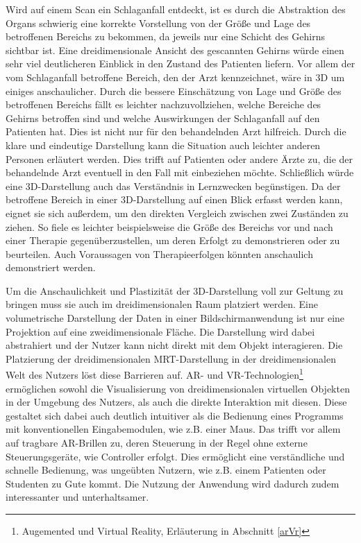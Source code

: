 Wird auf einem Scan ein Schlaganfall entdeckt, ist es durch die Abstraktion des Organs schwierig eine korrekte Vorstellung von der Größe und Lage des betroffenen Bereichs zu bekommen, da jeweils nur eine Schicht des Gehirns sichtbar ist. 
Eine dreidimensionale Ansicht des gescannten Gehirns würde einen sehr viel deutlicheren Einblick in den Zustand des Patienten liefern. Vor allem der vom Schlaganfall betroffene Bereich, den der Arzt kennzeichnet, wäre in 3D um einiges anschaulicher. Durch die bessere Einschätzung von Lage und Größe des betroffenen Bereichs fällt es leichter nachzuvollziehen, welche Bereiche des Gehirns betroffen sind und welche Auswirkungen der Schlaganfall auf den Patienten hat. Dies ist nicht nur für den behandelnden Arzt hilfreich. Durch die klare und eindeutige Darstellung kann die Situation auch leichter anderen Personen erläutert werden. Dies trifft auf Patienten oder andere Ärzte zu, die der behandelnde Arzt eventuell in den Fall mit einbeziehen möchte.
Schließlich würde eine 3D-Darstellung auch das Verständnis in Lernzwecken begünstigen. 
Da der betroffene Bereich in einer 3D-Darstellung auf einen Blick erfasst werden kann, eignet sie sich außerdem, um den direkten Vergleich zwischen zwei Zuständen zu ziehen. So fiele es leichter beispielsweise die Größe des Bereichs vor und nach einer Therapie gegenüberzustellen, um deren Erfolgt zu demonstrieren oder zu beurteilen.
Auch Voraussagen von Therapieerfolgen könnten anschaulich demonstriert werden.

Um die Anschaulichkeit und Plastizität der 3D-Darstellung voll zur Geltung zu bringen muss sie auch im dreidimensionalen Raum platziert werden. Eine volumetrische Darstellung der Daten in einer Bildschirmanwendung ist nur eine Projektion auf eine zweidimensionale Fläche. Die Darstellung wird dabei abstrahiert und der Nutzer kann nicht direkt mit dem Objekt interagieren.
Die Platzierung der dreidimensionalen MRT-Darstellung in der dreidimensionalen Welt des Nutzers löst diese Barrieren auf. AR- und VR-Technologien\footnote{Augemented und Virtual Reality, Erläuterung in Abschnitt \ref{arVr}} ermöglichen sowohl die Visualisierung von dreidimensionalen virtuellen Objekten in der Umgebung des Nutzers, als auch die direkte Interaktion mit diesen. Diese gestaltet sich dabei auch deutlich intuitiver als die Bedienung eines Programms mit konventionellen Eingabemodulen, wie z.B. einer Maus. Das trifft vor allem auf tragbare AR-Brillen zu, deren Steuerung in der Regel ohne externe Steuerungsgeräte, wie Controller erfolgt. Dies ermöglicht eine verständliche und schnelle Bedienung, was ungeübten Nutzern, wie z.B. einem Patienten oder Studenten zu Gute kommt. Die Nutzung der Anwendung wird dadurch zudem interessanter und unterhaltsamer.

